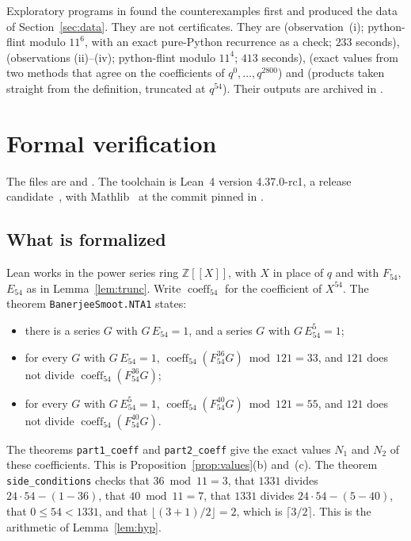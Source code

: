 \documentclass[11pt]{amsart}
\theoremstyle{definition}
\theoremstyle{remark}
\newcommand{\Z}{\mathbb{Z}}
\DeclareMathOperator{\coeff}{coeff}
\begin{document}
Exploratory programs in  found the counterexamples first and produced the data of Section~\ref{sec:data}. They are not certificates. They are  (observation~(i); python-flint modulo \(11^6\), with an exact pure-Python recurrence as a check; \(233\) seconds),  (observations (ii)--(iv); python-flint modulo \(11^4\); \(413\) seconds),  (exact values from two methods that agree on the coefficients of \(q^0,\dots,q^{2800}\)) and  (products taken straight from the definition, truncated at \(q^{54}\)). Their outputs are archived in .

\section{Formal verification}\label{sec:lean}

The files are  and . The toolchain is Lean~4 version 4.37.0-rc1, a release candidate~\cite{Lean4}, with Mathlib~\cite{Mathlib} at the commit pinned in .

\subsection*{What is formalized}
Lean works in the power series ring \(\Z[[X]]\), with \(X\) in place of \(q\) and with \(F_{54}\), \(E_{54}\) as in Lemma~\ref{lem:trunc}. Write \(\coeff_{54}\) for the coefficient of \(X^{54}\). The theorem \texttt{BanerjeeSmoot.NTA1} states:
\begin{itemize}
\item there is a series \(G\) with \(G\,E_{54}=1\), and a series \(G\) with \(G\,E_{54}^5=1\);
\item for every \(G\) with \(G\,E_{54}=1\), \(\coeff_{54}(F_{54}^{36}G)\bmod121=33\), and \(121\) does not divide \(\coeff_{54}(F_{54}^{36}G)\);
\item for every \(G\) with \(G\,E_{54}^5=1\), \(\coeff_{54}(F_{54}^{40}G)\bmod121=55\), and \(121\) does not divide \(\coeff_{54}(F_{54}^{40}G)\).
\end{itemize}
The theorems \texttt{part1\_coeff} and \texttt{part2\_coeff} give the exact values \(N_1\) and \(N_2\) of these coefficients. This is Proposition~\ref{prop:values}(b) and~(c). The theorem \texttt{side\_conditions} checks that \(36\bmod11=3\), that \(1331\) divides \(24\cdot54-(1-36)\), that \(40\bmod11=7\), that \(1331\) divides \(24\cdot54-(5-40)\), that \(0\le54<1331\), and that \(\lfloor(3+1)/2\rfloor=2\), which is \(\lceil3/2\rceil\). This is the arithmetic of Lemma~\ref{lem:hyp}.
\end{document}
